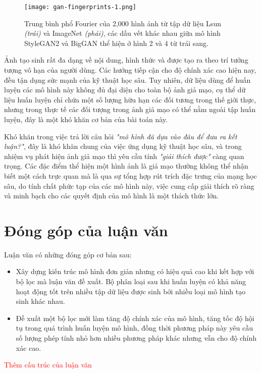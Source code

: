 \begin{itemize}
	\begin{figure}[htp]
		\centering
		\texttt{[image: gan-fingerprints-1.png]}
	    \vspace{10pt} %
	    
		\begin{minipage}{\linewidth}
			\caption{Trung bình phổ Fourier của 2,000 hình ảnh từ tập dữ liệu Lsun \textit{(trái)} và ImageNet \textit{(phải)}, các dấu vết khác nhau giữa mô hình StyleGAN2 và BigGAN thể hiện ở hình 2 và 4 từ trái sang.}
			\label{fig:gan-fingerprints-1}
		\end{minipage}
	\end{figure}
\end{itemize}
%
Ảnh tạo sinh rất đa dạng về nội dung, hình thức và được tạo ra theo trí tưởng tượng vô hạn của người dùng. Các hướng tiếp cận cho độ chính xác cao hiện nay, đều tận dụng sức mạnh của kỹ thuật học sâu. Tuy nhiên, dữ liệu dùng để huấn luyện các mô hình này không đủ đại diện cho toàn bộ ảnh giả mạo, cụ thể dữ liệu huấn luyện chỉ chứa một số lượng hữu hạn các đối tương trong thế giới thực, nhưng trong thực tế các đối tượng trong ảnh giả mạo có thể nằm ngoài tập huấn luyện, đây là một khó khăn cơ bản của bài toán này.

Khó khăn trong việc trả lời câu hỏi \textit{"mô hình đã dựa vào đâu để đưa ra kết luận?"}, đây là khó khăn chung của việc ứng dụng kỹ thuật học sâu, và trong nhiệm vụ phát hiện ảnh giả mạo thì yêu cầu tính \textit{"giải thích được"} càng quan trọng. Các đặc điểm thể hiện một hình ảnh là giả mạo thường không thể nhận biết một cách trực quan mà là qua sự tổng hợp rút trích đặc trưng của mạng học sâu, do tính chất phức tạp của các mô hình này, việc cung cấp giải thích rõ ràng và minh bạch cho các quyết định của mô hình là một thách thức lớn.

\section{Đóng góp của luận văn}
Luận văn có những đóng góp cơ bản sau:
\begin{itemize}
	\item Xây dựng kiến trúc mô hình đơn giản nhưng có hiệu quả cao khi kết hợp với bộ lọc mà luận văn đề xuất. Bộ phân loại sau khi huấn luyện có khả năng hoạt động tốt trên nhiều tập dữ liệu được sinh bởi nhiều loại mô hình tạo sinh khác nhau.
	\item Đề xuất một bộ lọc mới làm tăng độ chính xác của mô hình, tăng tốc độ hội tụ trong quá trình huấn luyện mô hình, đồng thời phương pháp này yêu cầu số lượng phép tính nhỏ hơn nhiều phương pháp khác nhưng vẫn cho độ chính xác cao.
\end{itemize}

\textcolor{red}{Thêm cấu trúc của luận văn}







